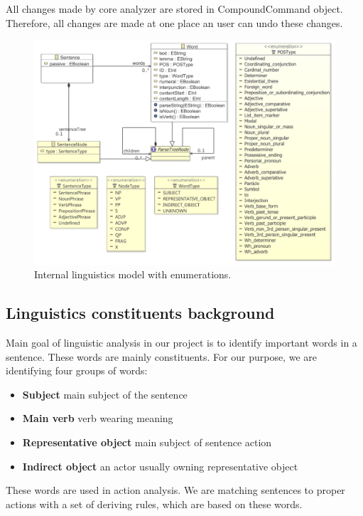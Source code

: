 All changes made by core analyzer are stored in CompoundCommand object. Therefore, all changes are made at one place an user can undo these changes.

\begin{figure}[ht]
  \centering
  \includegraphics[width=\textwidth]{images/ReprotoolLingModel}
  \caption{Internal linguistics model with enumerations.}
  \label{fig:ReprotoolLingModel}
\end{figure}

\subsection{Linguistics constituents background}
\label{sec:lingbackground}
Main goal of linguistic analysis in our project is to identify important words in a sentence. These words are mainly constituents. For our purpose, we are identifying four groups of words:

\begin{itemize}
\item {\bf Subject} main subject of the sentence
\item {\bf Main verb} verb wearing meaning
\item {\bf Representative object} main subject of sentence action
\item {\bf Indirect object} an actor usually owning representative object
\end{itemize}

These words are used in action analysis. We are matching sentences to proper actions with a set of deriving rules, which are based on these words. 
                                                                    
